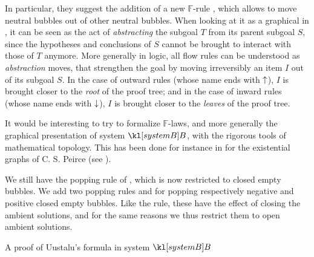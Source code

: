 \begin{description}
  In particular, they suggest the addition of a new $\mathbb{F}$-rule
  , which allows to move neutral bubbles out of other neutral
  bubbles. When looking at it as a graphical  in
  , it can be seen as the act of \emph{abstracting} the
  subgoal $T$ from its parent subgoal $S$, since the hypotheses and conclusions
  of $S$ cannot be brought to interact with those of $T$ anymore. More generally
  in  logic, all flow rules can be understood as
  \emph{abstraction} moves, that strengthen the goal by moving irreversibly an
  item $I$ out of its subgoal $S$. In the case of outward rules (whose name ends
  with $\uparrow$), $I$ is brought closer to the \emph{root} of the proof tree;
  and in the case of inward rules (whose name ends with $\downarrow$), $I$ is
  brought closer to the \emph{leaves} of the proof tree.
  
  It would be interesting to try to formalize $\mathbb{F}$-laws, and more
  generally the graphical presentation of system $\sysB$, with the rigorous
  tools of mathematical topology. This has been done for instance in
   for the existential graphs of C. S.
  Peirce (see ).

  \item[\textbf{\membrane}] 
  We still have the popping rule  of , which is now restricted to
  closed empty bubbles. We add two popping rules  and  for
  popping respectively negative and positive closed empty bubbles. Like the
   rule, these have the effect of closing the ambient
  solutions, and for the same reasons we thus restrict them to open ambient
  solutions.

  \begin{marginfigure}
    
    \caption{A proof of Uustalu's formula in system $\sysB$}
  \end{marginfigure}


\end{description}
